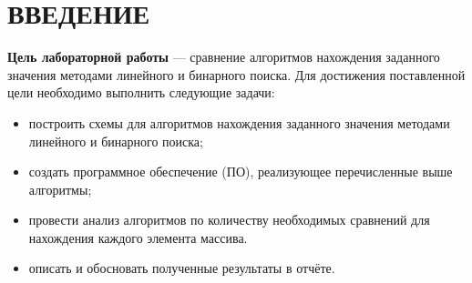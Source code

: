 \chapter*{ВВЕДЕНИЕ}

\textbf{Цель лабораторной работы} --- сравнение алгоритмов нахождения заданного значения методами линейного и бинарного поиска. Для достижения поставленной цели необходимо выполнить следующие задачи:

\begin{itemize}[label=--]
    \item построить схемы для алгоритмов нахождения заданного значения методами линейного и бинарного поиска;
    \item создать программное обеспечение (ПО), реализующее перечисленные выше алгоритмы;
    \item провести анализ алгоритмов по количеству необходимых сравнений для нахождения каждого элемента массива.
    \item описать и обосновать полученные результаты в отчёте.
\end{itemize}
